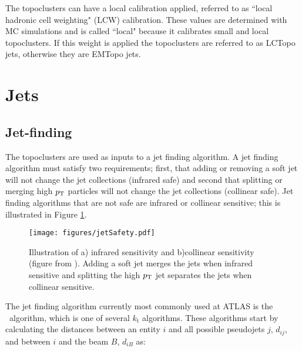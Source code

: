 The topoclusters can have a local calibration applied, referred to as ``local hadronic cell weighting" (LCW) calibration.  These values are determined with MC simulations and is called ``local" because it calibrates small and local topoclusters.  If this weight is applied the topoclusters are referred to as LCTopo jets, otherwise they are EMTopo jets. \\

\section{Jets} \label{sec:jets}

\subsection{Jet-finding}

The topoclusters are used as inputs to a jet finding algorithm.  A jet finding algorithm must satisfy two requirements; first, that adding or removing a soft jet will not change the jet collections (infrared safe) and second that splitting or merging high $p_{\mathrm{T}}$ particles will not change the jet collections (collinear safe).  Jet finding algorithms that are not safe are infrared or collinear sensitive; this is illustrated in Figure \ref{fig:jetsafety}.  \\

\begin{figure}[h]
	\centering
	\texttt{[image: figures/jetSafety.pdf]}
	\caption[Infrared sensitivity and collinear sensitivity]{Illustration of a) infrared sensitivity and b)collinear sensitivity (figure from \cite{IRCDiagram}).  Adding a soft jet merges the jets when infrared sensitive and splitting the high $p_{\mathrm{T}}$ jet separates the jets when collinear sensitive.}
	\label{fig:jetsafety}
\end{figure}

The jet finding algorithm currently most commonly used at ATLAS is the \antikt\ algorithm, which is one of several $k_{\mathrm{t}}$ algorithms.  These algorithms start by calculating the distances between an entity $i$ and all possible pseudojets $j$, $d_{ij}$, and between $i$ and the beam $B$, $d_{iB}$ as:  

